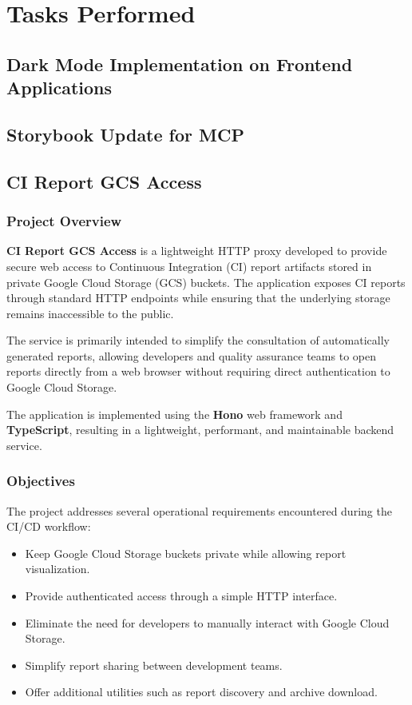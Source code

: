 \chapter{Tasks Performed}

\section{Dark Mode Implementation on Frontend Applications}

\clearpage

\section{Storybook Update for MCP}

\clearpage

\section{CI Report GCS Access}

\subsection{Project Overview}

\textbf{CI Report GCS Access} is a lightweight HTTP proxy developed to provide secure web access to Continuous Integration (CI) report artifacts stored in private Google Cloud Storage (GCS) buckets. The application exposes CI reports through standard HTTP endpoints while ensuring that the underlying storage remains inaccessible to the public.

The service is primarily intended to simplify the consultation of automatically generated reports, allowing developers and quality assurance teams to open reports directly from a web browser without requiring direct authentication to Google Cloud Storage.

The application is implemented using the \textbf{Hono} web framework and \textbf{TypeScript}, resulting in a lightweight, performant, and maintainable backend service.

\subsection{Objectives}

The project addresses several operational requirements encountered during the CI/CD workflow:

\begin{itemize}
    \item Keep Google Cloud Storage buckets private while allowing report visualization.
    \item Provide authenticated access through a simple HTTP interface.
    \item Eliminate the need for developers to manually interact with Google Cloud Storage.
    \item Simplify report sharing between development teams.
    \item Offer additional utilities such as report discovery and archive download.
\end{itemize}

